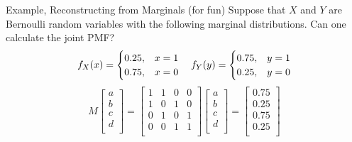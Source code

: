 \documentclass[handout]{beamer}
\begin{document}
\begin{frame}{Example, Reconstructing from Marginals (for fun)}
    Suppose that $X$ and $Y$ are Bernoulli random variables with the following marginal distributions. Can one calculate the joint PMF?
    $$
        f_X(x) = \begin{cases} 
            0.25 , & x=1 \\ 
            0.75, & x=0
        \end{cases}
        \hskip 1em
        f_Y(y) = \begin{cases} 
            0.75 , & y=1 \\ 
            0.25, & y=0
        \end{cases}
    $$
    $$
    M
    \begin{bmatrix}
        a \\
        b \\
        c \\
        d \\
    \end{bmatrix}
    =
    \begin{bmatrix}
        1 & 1 & 0 & 0 \\
        1 & 0 & 1 & 0 \\
        0 & 1 & 0 & 1 \\
        0 & 0 & 1 & 1 \\
    \end{bmatrix}
    \begin{bmatrix}
        a \\
        b \\
        c \\
        d \\
    \end{bmatrix}
    =
    \begin{bmatrix}
        0.75\\
        0.25 \\
        0.75 \\
        0.25 \\
    \end{bmatrix}
    $$
\end{frame}
\end{document}
